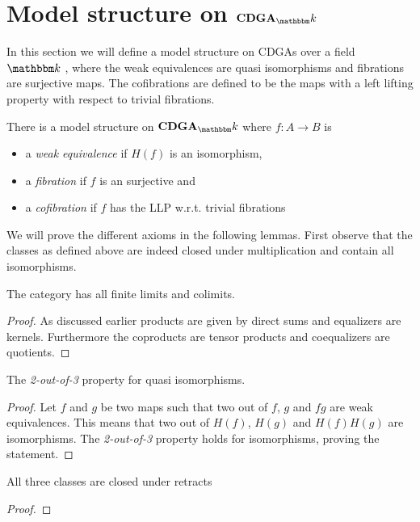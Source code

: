\section{Model structure on $\CDGA_\k$}

In this section we will define a model structure on CDGAs over a field $\k$ , where the weak equivalences are quasi isomorphisms and fibrations are surjective maps. The cofibrations are defined to be the maps with a left lifting property with respect to trivial fibrations.

\begin{proposition}
	There is a model structure on $\CDGA_\k$ where $f: A \to B$ is
	\begin{itemize}
		\item a \emph{weak equivalence} if $H(f)$ is an isomorphism,
		\item a \emph{fibration} if $f$ is an surjective and
		\item a \emph{cofibration} if $f$ has the LLP w.r.t. trivial fibrations
	\end{itemize}
\end{proposition}

We will prove the different axioms in the following lemmas. First observe that the classes as defined above are indeed closed under multiplication and contain all isomorphisms.

\begin{lemma}
	[MC1] The category has all finite limits and colimits.
\end{lemma}
\begin{proof}
	As discussed earlier  products are given by direct sums and equalizers are kernels. Furthermore the coproducts are tensor products and coequalizers are quotients.
\end{proof}

\begin{lemma}
	[MC2] The \emph{2-out-of-3} property for quasi isomorphisms.
\end{lemma}
\begin{proof}
	Let $f$ and $g$ be two maps such that two out of $f$, $g$ and $fg$ are weak equivalences. This means that two out of $H(f)$, $H(g)$ and $H(f)H(g)$ are isomorphisms. The \emph{2-out-of-3} property holds for isomorphisms, proving the statement.
\end{proof}

\begin{lemma}
	[MC3] All three classes are closed under retracts
\end{lemma}
\begin{proof}
\end{proof}

